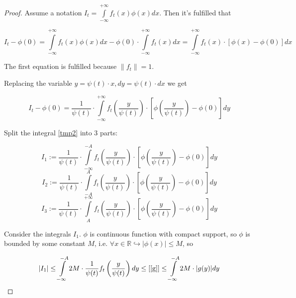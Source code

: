 \documentclass{article}
\begin{document}
    \begin{proof}
        Assume a notation $I_t = \int\limits_{-\infty}^{+\infty} f_t(x) \phi(x) dx$. Then it's fulfilled that

        \begin{equation*}
            I_t - \phi(0) = \int\limits_{-\infty}^{+\infty} f_t(x) \phi(x) dx - \phi(0) \cdot \int\limits_{-\infty}^{+\infty} f_t(x) dx = \int\limits_{-\infty}^{+\infty} f_t(x) \cdot [\phi(x) - \phi(0)] dx
        \end{equation*}

        The first equation is fulfilled because $\|f_t\| = 1$.

        \newpage
        
        Replacing the variable $y = \psi(t) \cdot x, dy = \psi(t) \cdot dx$ we get

        \begin{equation} \label{tmp2}
            I_t - \phi(0) = \dfrac{1}{\psi(t)} \cdot \int\limits_{-\infty}^{+\infty} f_t\left(\frac{y}{\psi(t)}\right) \cdot \left[\phi\left(\frac{y}{\psi(t)}\right) - \phi(0)\right] dy
        \end{equation}

        Split the integral \eqref{tmp2} into 3 parts:
        
        \begin{equation*}
            I_1 := \dfrac{1}{\psi(t)} \cdot \int\limits_{-\infty}^{-A} f_t\left(\frac{y}{\psi(t)}\right) \cdot \left[\phi\left(\frac{y}{\psi(t)}\right) - \phi(0)\right] dy
        \end{equation*}
        \begin{equation*}
            I_2 := \dfrac{1}{\psi(t)} \cdot \int\limits_{-A}^{A} f_t\left(\frac{y}{\psi(t)}\right) \cdot \left[\phi\left(\frac{y}{\psi(t)}\right) - \phi(0)\right] dy
        \end{equation*}
        \begin{equation*}
            I_3 := \dfrac{1}{\psi(t)} \cdot \int\limits_{A}^{+\infty} f_t\left(\frac{y}{\psi(t)}\right) \cdot \left[\phi\left(\frac{y}{\psi(t)}\right) - \phi(0)\right] dy
        \end{equation*}

        Consider the integrals $I_1$. $\phi$ is continuous function with compact support, so $\phi$ is bounded by some constant $M$, i.e. $\forall x \in \mathbb{R} \hookrightarrow |\phi(x)| \leq M$, so 

        \begin{equation*}
            \left|I_1\right| \leq \int\limits_{-\infty}^{-A} 2 M \cdot \dfrac{1}{\psi(t)} f_t\left(\frac{y}{\psi(t)}\right) dy \leq \left[\eqref{g}\right]
            \leq \int\limits_{-\infty}^{-A} 2 M \cdot |g(y)| dy 
        \end{equation*}


\end{proof}
\end{document}
